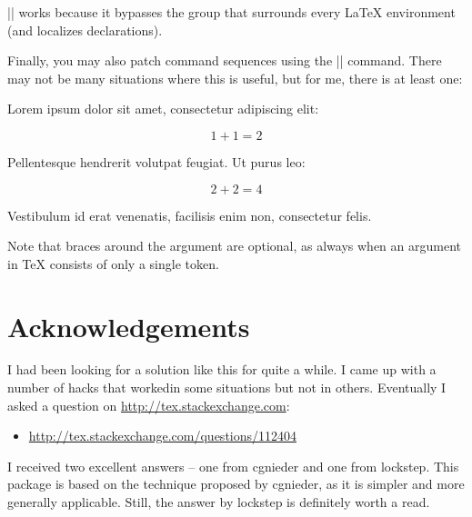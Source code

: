 \documentclass[a4paper]{packagedoc}
\begin{document}
|\NoIndentAfterEnv| works because it bypasses the group
that surrounds every \LaTeX{} environment (and localizes
declarations). 




Finally, you may also patch command sequences using the
|\NoIndentAfterCmd| command. There may not be many situations
where this is useful, but for me, there is at least one:

\begin{latex-example-show}
	Lorem ipsum dolor sit amet, consectetur adipiscing elit:
	
	\[ 1 + 1 = 2 \]
	
	Pellentesque hendrerit volutpat feugiat. Ut purus leo:
	
	\NoIndentAfterCmd \]
	
	\[ 2 + 2 = 4 \]
	
	Vestibulum id erat venenatis, facilisis enim non,
	consectetur felis.
\end{latex-example-show}

Note that braces around the  argument are
optional, as always when an argument in \TeX{} consists
of only a single token.



\section{Acknowledgements}                                                     %

I had been looking for a solution like this for quite a while. I came up
with a number of hacks that workedin some situations but not in others.
Eventually I asked a question on \url{http://tex.stackexchange.com}:
\begin{itemize}
  \item \url{http://tex.stackexchange.com/questions/112404}
\end{itemize}

I received two excellent answers -- one from cgnieder and one from lockstep.
This package is based on the technique proposed by cgnieder, as it is
simpler and more generally applicable. Still, the answer by lockstep
is definitely worth a read.

\end{document}
